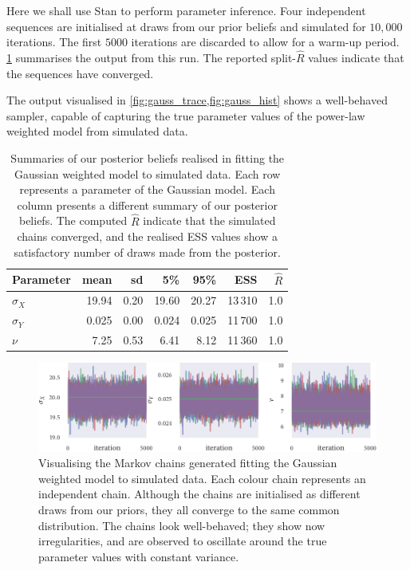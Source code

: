 Here we shall use Stan to perform parameter inference. Four independent
sequences are initialised at draws from our prior beliefs and simulated for
$10,000$ iterations. The first $5000$ iterations are discarded to allow for a
warm-up period. \cref{tab:gauss_summary} summarises the output from this run.
The reported split-$\widehat{R}$ values indicate that the sequences have
converged.

The output visualised in \cref{fig:gauss_trace,fig:gauss_hist} shows a
well-behaved sampler, capable of capturing the true parameter values of the
power-law weighted model from simulated data.

\begin{table}[tbp]
  \begin{tabular}{@{}lrrrrrr@{}}
    \toprule
    Parameter    & mean  & sd   & 5\%   & 95\%  & ESS     & $\widehat{R}$ \\
    \midrule
    $\sigma_{X}$ & 19.94 & 0.20 & 19.60 & 20.27 & 13\,310 & 1.0           \\
    $\sigma_{Y}$ & 0.025 & 0.00 & 0.024 & 0.025 & 11\,700 & 1.0           \\
    $\nu$        & 7.25  & 0.53 & 6.41  & 8.12  & 11\,360 & 1.0           \\
    \bottomrule
  \end{tabular}
  \caption{Summaries of our posterior beliefs realised in fitting the Gaussian
    weighted model to simulated data. Each row represents a parameter of the
    Gaussian model. Each column presents a different summary of our posterior
    beliefs. The computed $\widehat{R}$ indicate that the simulated chains
    converged, and the realised ESS values show a satisfactory number of draws
    made from the posterior.}
  \label{tab:gauss_summary}
\end{table}%
\begin{figure}[tbp]
  \includegraphics{gauss_trace.pdf}
  \caption{Visualising the Markov chains generated fitting the Gaussian
    weighted model to simulated data. Each colour chain represents an independent
    chain. Although the chains are initialised as different draws from our
    priors, they all converge to the same common distribution. The chains look
    well-behaved; they show now irregularities, and are observed to oscillate
    around the true parameter values with constant variance.}
  \label{fig:gauss_trace}
\end{figure}%
